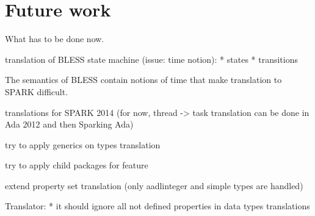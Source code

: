 
\cleardoublepage

\chapter{Future work}
\label{future_work}

What has to be done now.

translation of BLESS state machine (issue: time notion):
	* states
	* transitions

The semantics of BLESS contain notions of time that make translation to SPARK difficult.

translations for SPARK 2014 (for now, thread -> task translation can be done in Ada 2012 and then Sparking Ada)

try to apply generics on types translation

try to apply child packages for feature 

extend property set translation (only aadlinteger and simple types are handled)

Translator:
* it should ignore all not defined properties in data types translations